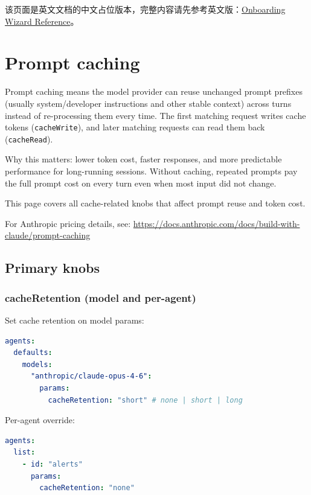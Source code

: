 该页面是英文文档的中文占位版本，完整内容请先参考英文版：\href{/reference/wizard}{Onboarding Wizard Reference}。


\clearpage
\section{Prompt caching}


Prompt caching means the model provider can reuse unchanged prompt prefixes (usually system/developer instructions and other stable context) across turns instead of re-processing them every time. The first matching request writes cache tokens (\texttt{cacheWrite}), and later matching requests can read them back (\texttt{cacheRead}).

Why this matters: lower token cost, faster responses, and more predictable performance for long-running sessions. Without caching, repeated prompts pay the full prompt cost on every turn even when most input did not change.

This page covers all cache-related knobs that affect prompt reuse and token cost.

For Anthropic pricing details, see:
\href{https://docs.anthropic.com/docs/build-with-claude/prompt-caching}{https://docs.anthropic.com/docs/build-with-claude/prompt-caching}

\subsection{Primary knobs}


\subsubsection{cacheRetention (model and per-agent)}


Set cache retention on model params:

\begin{lstlisting}[language=yaml]
agents:
  defaults:
    models:
      "anthropic/claude-opus-4-6":
        params:
          cacheRetention: "short" # none | short | long
\end{lstlisting}


Per-agent override:

\begin{lstlisting}[language=yaml]
agents:
  list:
    - id: "alerts"
      params:
        cacheRetention: "none"
\end{lstlisting}


